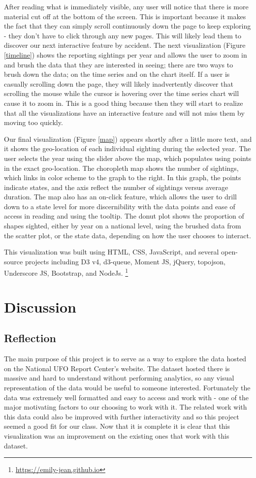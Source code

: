 \documentclass[journal]{vgtc}                %
\begin{document}
After reading what is immediately visible, any user will notice that there is more material cut off at the bottom of the screen. This is important because it makes the fact that they can simply scroll continuously down the page to keep exploring - they don't have to click through any new pages. This will likely lead them to discover our next interactive feature by accident. The next visualization (Figure \ref{timeline}) shows the reporting sightings per year and allows the user to zoom in and brush the data that they are interested in seeing; there are two ways to brush down the data; on the time series and on the chart itself. If a user is casually scrolling down the page, they will likely inadvertently discover that scrolling the mouse while the cursor is hovering over the time series chart will cause it to zoom in. This is a good thing because then they will start to realize that all the visualizations have an interactive feature and will not miss them by moving too quickly.

Our final visualization (Figure \ref{map}) appears shortly after a little more text, and it shows the geo-location of each individual sighting during the selected year. The user selects the year using the slider above the map, which populates using points in the exact geo-location. The choropleth map shows the number of sightings, which links in color scheme to the graph to the right. In this graph, the points indicate states, and the axis reflect the number of sightings versus average duration. The map also has an on-click feature, which allows the user to drill down to a state level for more discernibility with the data points and ease of access in reading and using the tooltip. The donut plot shows the proportion of shapes sighted, either by year on a national level, using the brushed data from the scatter plot, or the state data, depending on how the user chooses to interact. 

This visualization was built using HTML, CSS, JavaScript, and several open-source projects including D3 v4, d3-queue, Moment JS, jQuery, topojson, Underscore JS, Bootstrap, and NodeJs. \footnote{\url{https://emily-jean.github.io}}

\section{Discussion}
\subsection{Reflection}
The main purpose of this project is to serve as a way to explore the data hosted on the National UFO Report Center's website. The dataset hosted there is massive and hard to understand without performing analytics, so any visual representation of the data would be useful to someone interested. Fortunately the data was extremely well formatted and easy to access and work with - one of the major motivating factors to our choosing to work with it. The related work with this data could also be improved with further interactivity and so this project seemed a good fit for our class. Now that it is complete it is clear that this visualization was an improvement on the existing ones that work with this dataset. 
\end{document}
